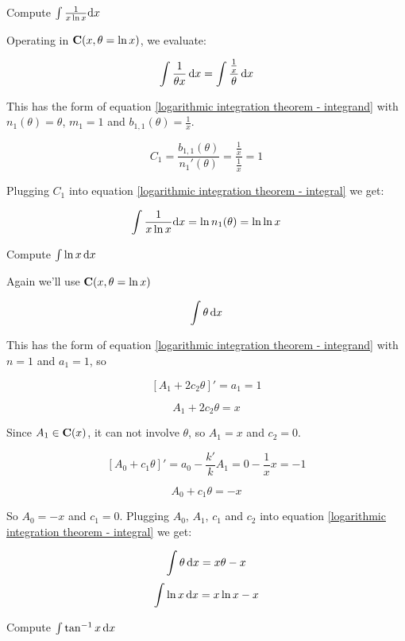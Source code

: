 \example Compute $\int {1\over{x \ln x}} {\rm d}x$

Operating in ${\bf C}(x, \theta = \ln x)$, we evaluate:

$$\int {1\over{\theta x}} \,\mathrm{d} x = \int {{1\over x}\over{\theta}} \,\mathrm{d} x$$

This has the form of equation \eqref{logarithmic integration theorem - integrand}
with $n_1(\theta) = \theta$, $m_1 = 1$ and $b_{1,1}(\theta) = \frac{1}{x}$.

$$C_1 = \frac{b_{1,1}(\theta)}{n_1'(\theta)} = \frac{\frac{1}{x}}{\frac{1}{x}} = 1$$

Plugging $C_1$ into equation \eqref{logarithmic integration theorem - integral} we get:

$$\int {1\over{x \ln x}} {\rm d}x = \ln n_1(\theta) = \ln \ln x$$

\endexample

\example
\label{ex: integrate ln x}
Compute $\int \ln x \,{\rm d}x$

Again we'll use ${\bf C}(x, \theta = \ln x)$

$$\int \theta \,\mathrm{d} x$$

This has the form of equation \eqref{logarithmic integration theorem - integrand}
with $n=1$ and $a_1 = 1$, so

$$\left[ A_1 + 2 c_2 \theta \right]' = a_1 = 1$$

$$A_1 + 2 c_2 \theta = x$$

Since $A_1 \in {\bf C}(x)$, it can not involve $\theta$, so $A_1 = x$ and $c_2 = 0$.

$$\left[ A_0 + c_1 \theta \right]' = a_0 - \frac{k'}{k} A_1 = 0 - \frac{1}{x} x = -1$$

$$A_0 + c_1 \theta = -x$$

So $A_0 = -x$ and $c_1 = 0$.  Plugging $A_0$, $A_1$, $c_1$ and $c_2$ into
equation \eqref{logarithmic integration theorem - integral} we get:

$$\int \theta \,\mathrm{d} x = x\theta - x$$
$$\int \ln x \,{\rm d}x = x \ln x - x$$

\endexample

\vfill\eject

\example Compute $\int \tan^{-1} x\, {\rm d}x$

\begin{comment}

The ``standard'' approach to this integral would be to note that the
derivative of $\tan^{-1} x$ is $1/(x^2+1)$ and use integration by parts:

$$\int \tan^{-1} x\, {\rm d}x = x\, \tan^{-1}x - \int \frac{x\, {\rm d}x}{x^2+1}
= x\, \tan^{-1}x - \ln(x^2+1) + C$$

\end{comment}

